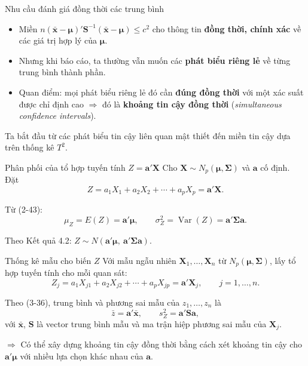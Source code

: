 

\begin{frame}{Nhu cầu đánh giá đồng thời các trung bình}
\begin{itemize}
  \item Miền $n(\bar{\mathbf x}-\boldsymbol\mu)'\mathbf S^{-1}(\bar{\mathbf x}-\boldsymbol\mu)\le c^2$
        cho thông tin \textbf{đồng thời, chính xác} về các giá trị hợp lý của
        $\boldsymbol\mu$.
  \item Nhưng khi báo cáo, ta thường vẫn muốn các \textbf{phát biểu riêng lẻ}
        về từng trung bình thành phần.
  \item Quan điểm: mọi phát biểu riêng lẻ đó cần \textbf{đúng đồng thời} với
        một xác suất được chỉ định cao $\Rightarrow$ đó là \textbf{khoảng tin
        cậy đồng thời} (\emph{simultaneous confidence intervals}).
\end{itemize}
\vspace{0.5em}
Ta bắt đầu từ các phát biểu tin cậy liên quan mật thiết đến miền tin cậy dựa
trên thống kê $T^2$.
\end{frame}
 
\begin{frame}{Phân phối của tổ hợp tuyến tính $Z=\mathbf a'\mathbf X$}
Cho $\mathbf X\sim N_p(\boldsymbol\mu,\boldsymbol\Sigma)$ và $\mathbf a$ cố định.
Đặt
\[
Z=a_1X_1+a_2X_2+\cdots+a_pX_p=\mathbf a'\mathbf X.
\]
 
Từ (2-43):
\[
\mu_Z=E(Z)=\mathbf a'\boldsymbol\mu,
\qquad
\sigma_Z^2=\operatorname{Var}(Z)=\mathbf a'\boldsymbol\Sigma\mathbf a.
\tag{$*3$}
\]
 
Theo Kết quả 4.2: $Z\sim N(\mathbf a'\boldsymbol\mu,\ \mathbf a'\boldsymbol\Sigma\mathbf a)$.
\end{frame}
 
\begin{frame}{Thống kê mẫu cho biến $Z$}
Với mẫu ngẫu nhiên $\mathbf X_1,\ldots,\mathbf X_n$ từ $N_p(\boldsymbol\mu,\boldsymbol\Sigma)$,
lấy tổ hợp tuyến tính cho mỗi quan sát:
\[
Z_j=a_1X_{j1}+a_2X_{j2}+\cdots+a_pX_{jp}=\mathbf a'\mathbf X_j,\qquad j=1,\ldots,n.
\]
 
Theo (3-36), trung bình và phương sai mẫu của $z_1,\ldots,z_n$ là
\[
\bar z=\mathbf a'\bar{\mathbf x},
\qquad
s_Z^2=\mathbf a'\mathbf S\mathbf a,
\tag{$*4$}
\]
với $\bar{\mathbf x}$, $\mathbf S$ là vector trung bình mẫu và ma trận hiệp
phương sai mẫu của $\mathbf X_j$.
 
\vspace{0.5em}
$\Rightarrow$ Có thể xây dựng khoảng tin cậy đồng thời bằng cách xét khoảng
tin cậy cho $\mathbf a'\boldsymbol\mu$ với nhiều lựa chọn khác nhau của $\mathbf a$.
\end{frame}
 
